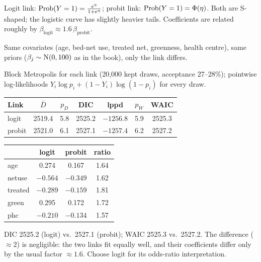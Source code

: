 \documentclass[11pt]{article}
\begin{document}
\begin{recall}
Logit link: $\mathrm{Prob}(Y=1)=\frac{e^\eta}{1+e^\eta}$; probit link: $\mathrm{Prob}(Y=1)=\Phi(\eta)$. Both are S-shaped; the logistic curve has slightly heavier tails. Coefficients are related roughly by $\beta_{\text{logit}}\approx1.6\,\beta_{\text{probit}}$.
\end{recall}

\begin{keyidea}
Same covariates (age, bed-net use, treated net, greenness, health centre), same priors ($\beta_j\sim\mathrm{N}(0,100)$ as in the book), only the link differs.
\end{keyidea}

\solution
{} Block Metropolis for each link (20{,}000 kept draws, acceptance 27--28\%); pointwise log-likelihoods $Y_i\log p_i+(1-Y_i)\log(1-p_i)$ for every draw.
\begin{center}
\begin{tabular}{lcccccc}\toprule
Link & $\bar D$ & $p_D$ & DIC & lppd & $p_W$ & WAIC\\\midrule
logit & 2519.4 & 5.8 & 2525.2 & $-1256.8$ & 5.9 & 2525.3\\
probit & 2521.0 & 6.1 & 2527.1 & $-1257.4$ & 6.2 & 2527.2\\\bottomrule
\end{tabular}
\end{center}
\begin{center}
\begin{tabular}{lccc}\toprule
 & logit & probit & ratio\\\midrule
age & 0.274 & 0.167 & 1.64\\
netuse & $-0.564$ & $-0.349$ & 1.62\\
treated & $-0.289$ & $-0.159$ & 1.81\\
green & 0.295 & 0.172 & 1.72\\
phc & $-0.210$ & $-0.134$ & 1.57\\\bottomrule
\end{tabular}
\end{center}

\begin{answer}
DIC 2525.2 (logit) vs.\ 2527.1 (probit); WAIC 2525.3 vs.\ 2527.2. The difference ($\approx2$) is negligible: the two links fit equally well, and their coefficients differ only by the usual factor $\approx1.6$. Choose logit for its odds-ratio interpretation.
\end{answer}
\end{document}
